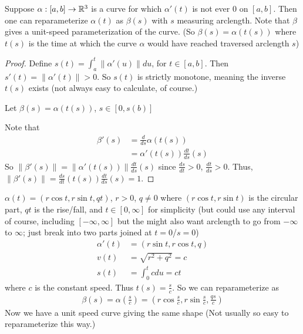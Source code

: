 \begin{theorem}
  Suppose $\alpha: [a, b] \rightarrow \mathbb{R}^3$ is a curve for which
  $\alpha'(t)$ is not ever $0$ on $[a, b]$. Then one can
  reparameterize $\alpha(t)$ as $\beta(s)$ with $s$ measuring
  arclength. Note that $\beta$ gives a unit-speed parameterization of
  the curve. (So $\beta(s) = \alpha(t(s))$ where $t(s)$ is the time at
  which the curve $\alpha$ would have reached traversed arclength $s$)
\end{theorem}
\begin{proof}
  Define $s(t) = \int_{a}^t \|\alpha'(u)\| du$, for $t \in [a,
  b]$. Then $s'(t) = \|\alpha'(t)\| > 0$. So $s(t)$ is strictly
  monotone, meaning the inverse $t(s)$ exists (not always easy to
  calculate, of course.)

Let $\beta(s) = \alpha(t(s))$, $s \in [0, s(b)]$

Note that
\begin{align*}
  \beta'(s) &= \frac{d}{ds} \alpha(t(s)) \\
&= \alpha'(t(s)) \frac{dt}{ds}(s)
\end{align*}
So $\|\beta'(s)\| = \|\alpha'(t(s))\| \frac{dt}{ds}(s)$ since
$\frac{ds}{dt} > 0$, $\frac{dt}{ds} > 0$.
Thus, $\|\beta'(s)\| =
\frac{ds}{dt}(t(s)) \frac{dt}{ds}(s) = 1$.

\end{proof}

\begin{example}
  $\alpha(t) = (r\cos t, r\sin t, qt)$, $r > 0$, $q \neq 0$ where
  $(r\cos t, r\sin t)$ is the circular part, $qt$ is the rise/fall,
  and $t \in [0, \infty]$ for simplicity (but could use any interval
  of course, including $[-\infty, \infty]$ but the might also want
  arclength to go from $-\infty$ to $\infty$; just break into two
  parts joined at $t = 0$/$s = 0$)
  \begin{align*}
    \alpha'(t) &= (r\sin t, r\cos t, q) \\
    v(t) &= \sqrt{r^2 + q^2} = c \\
    s(t) &= \int_0^t c du = ct
  \end{align*}
  where $c$ is the constant speed. Thus $t(s) = \frac{s}{c}$. So we
  can reparameterize as
  \begin{align*}
    \beta(s) = \alpha(\frac{s}{c}) = (r\cos \frac{s}{c}, r\sin
    \frac{s}{c}, \frac{qs}{c})
  \end{align*}
  Now we have a unit speed curve giving the same shape (Not usually so
  easy to reparameterize this way.)
\end{example}

